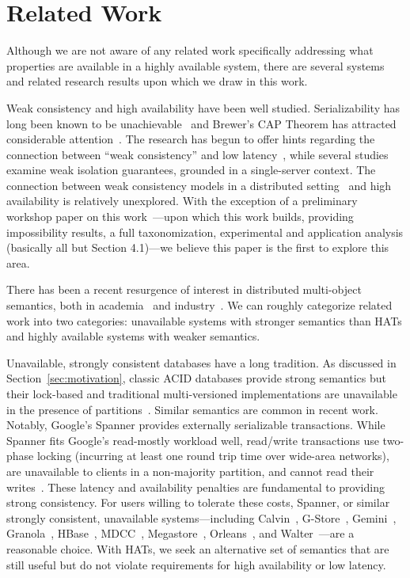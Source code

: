 
\section{Related Work}

Although we are not aware of any related work specifically addressing
what properties are available in a highly available system, there are
several systems and related research results upon which we draw in
this work.

Weak consistency and high availability have been well
studied. Serializability has long been known to be
unachievable~\cite{davidson-survey} and Brewer's CAP Theorem has
attracted considerable attention~\cite{gilbert-cap}. The research has
begun to offer hints regarding the connection between ``weak
consistency'' and low latency~\cite{abadi-pacelc}, while several
studies~\cite{adya, ansicritique} examine weak isolation guarantees,
grounded in a single-server context. The connection between weak
consistency models in a distributed setting~\cite{calm, crdt} and high
availability is relatively unexplored. With the exception of a
preliminary workshop paper on this work~\cite{hat-hotos}---upon which
this work builds, providing impossibility results, a full
taxonomization, experimental and application analysis (basically all
but Section 4.1)---we believe this paper is the first to explore this
area.


There has been a recent resurgence of interest in distributed
multi-object semantics, both in academia~\cite{kraska-s3, granola,
  gstore, mdcc, redblue, cops, eiger, walter,calvin, swift} and
industry~\cite{megastore, orleans, spanner}. We can roughly categorize
related work into two categories: unavailable systems with stronger
semantics than HATs and highly available systems with weaker
semantics.

Unavailable, strongly consistent databases have a long tradition. As
discussed in Section~\ref{sec:motivation}, classic ACID databases
provide strong semantics but their lock-based and traditional
multi-versioned implementations are unavailable in the presence of
partitions~\cite{bernstein-concurrency, bernstein-book,
  gray-isolation}. Similar semantics are common in recent
work. Notably, Google's Spanner provides externally serializable
transactions. While Spanner fits Google's read-mostly workload well,
read/write transactions use two-phase locking (incurring at least one
round trip time over wide-area networks), are unavailable to clients
in a non-majority partition, and cannot read their
writes~\cite{spanner}. These latency and availability penalties are
fundamental to providing strong consistency. For users willing to
tolerate these costs, Spanner, or similar strongly consistent,
unavailable systems---including Calvin~\cite{calvin},
G-Store~\cite{gstore}, Gemini~\cite{redblue}, Granola~\cite{granola},
HBase~\cite{hbase}, MDCC~\cite{mdcc}, Megastore~\cite{megastore},
Orleans~\cite{orleans}, and Walter~\cite{walter}---are a reasonable
choice. With HATs, we seek an alternative set of semantics that are
still useful but do not violate requirements for high availability or
low latency.
